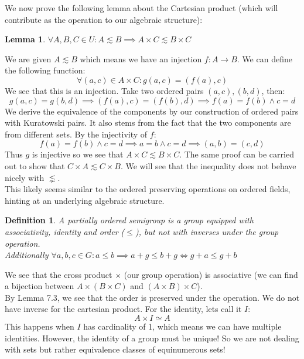 \documentclass{article}
\newtheorem{lem}{Lemma}[section]
\newtheorem{defn}{Definition}[section]
\begin{document}
\medskip
We now prove the following lemma about the Cartesian product (which will contribute as the operation to our algebraic structure):
\begin{lem}
$\forall A, B, C \in U: A \lesssim B \implies A \times C \lesssim B \times C$
\end{lem}
We are given $A \lesssim B$ which means we have an injection $f: A \xrightarrow{} B$. We can define the following function:
\begin{equation*}
    \forall (a, c) \in A \times C: g(a, c) = (f(a), c)
\end{equation*}
We see that this is an injection. Take two ordered pairs $(a, c), (b, d)$, then:
\begin{equation*}
    g(a, c) = g(b, d) \implies (f(a), c) = (f(b), d) \implies f(a) = f(b) \land c = d
\end{equation*}
We derive the equivalence of the components by our construction of ordered pairs with Kuratowski pairs. It also stems from the fact that the two components are from different sets. By the injectivity of $f$:
\begin{equation*}
    f(a) = f(b) \land c = d \implies a = b \land c = d \implies (a, b) = (c, d)
\end{equation*}
Thus $g$ is injective so we see that $A \times C \lesssim B \times C$. The same proof can be carried out to show that $C \times A \lesssim C \times B$. We will see that the inequality does not behave nicely with $\lnsim$.\\

This likely seems similar to the ordered preserving operations on ordered fields, hinting at an underlying algebraic structure.\\

\begin{defn}
A partially ordered semigroup is a group equipped with associativity, identity and order ($\leqslant$), but not with inverses under the group operation.\\
Additionally $\forall a, b, c \in G: a \leqslant b \implies a + g \leqslant b + g \iff g + a \leqslant g + b$
\end{defn}
We see that the cross product $\times$ (our group operation) is associative (we can find a bijection between $A \times (B \times C)$ and $(A \times B) \times C$).\\

By Lemma 7.3, we see that the order is preserved under the operation. We do not have inverse for the cartesian product. For the identity, lets call it $I$:
\begin{equation*}
    A \times I \simeq A
\end{equation*}
This happens when $I$ has cardinality of 1, which means we can have multiple identities. However, the identity of a group must be unique! So we are not dealing with sets but rather equivalence classes of equinumerous sets!\\
\end{document}
